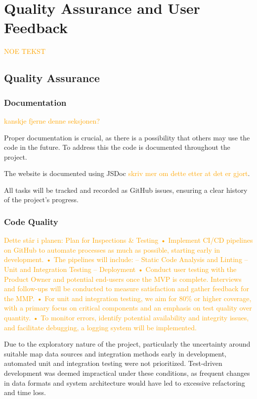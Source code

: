 \chapter{Quality Assurance and User Feedback}\label{chap:testinganduserfeedback}

\textcolor{orange}{NOE TEKST}

\section{Quality Assurance}

\subsection{Documentation}
\textcolor{orange}{kanskje fjerne denne seksjonen?}

Proper documentation is crucial, as there is a possibility that others may use the code in the
future. To address this the code is documented throughout the project. 

The website is documented using JSDoc \textcolor{orange}{skriv mer om dette etter at det er gjort}.  


All tasks will be tracked and recorded as GitHub issues, ensuring a clear
history of the project’s progress. 

\subsection{Code Quality} %

\textcolor{orange}{Dette står i planen: Plan for Inspections & Testing
• Implement CI/CD pipelines on GitHub to automate processes as much as possible, starting
early in development.
• The pipelines will include:
– Static Code Analysis and Linting
– Unit and Integration Testing
– Deployment
• Conduct user testing with the Product Owner and potential end-users once the MVP is
complete. Interviews and follow-ups will be conducted to measure satisfaction and gather
feedback for the MMP.
• For unit and integration testing, we aim for 80\% or higher coverage, with a primary focus on
critical components and an emphasis on test quality over quantity.
• To monitor errors, identify potential availability and integrity issues, and facilitate debugging,
a logging system will be implemented.}

Due to the exploratory nature of the project, particularly the uncertainty around suitable map data sources and integration methods early in development, automated unit and integration testing were not prioritized. Test-driven development was deemed impractical under these conditions, as frequent changes in data formats and system architecture would have led to excessive refactoring and time loss.

